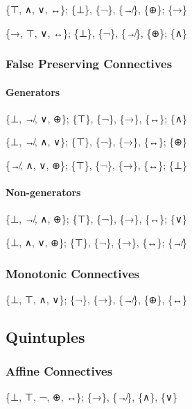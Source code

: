 \{⊤, ∧, ∨, ↔\}; \{⊥\}, \{¬\}, \{↛\}, \{⊕\}; \{→\}

\{→, ⊤, ∨, ↔\}; \{⊥\}, \{¬\}, \{↛\}, \{⊕\}; \{∧\}

\hypertarget{false-preserving-connectives-1}{%
\subsubsection{False Preserving
Connectives}\label{false-preserving-connectives-1}}

\hypertarget{generators-4}{%
\paragraph{Generators}\label{generators-4}}

\{⊥, ↛, ∨, ⊕\}; \{⊤\}, \{¬\}, \{→\}, \{↔\}; \{∧\}

\{⊥, ↛, ∧, ∨\}; \{⊤\}, \{¬\}, \{→\}, \{↔\}; \{⊕\}

\{↛, ∧, ∨, ⊕\}; \{⊤\}, \{¬\}, \{→\}, \{↔\}; \{⊥\}

\hypertarget{non-generators-4}{%
\paragraph{Non-generators}\label{non-generators-4}}

\{⊥, ↛, ∧, ⊕\}; \{⊤\}, \{¬\}, \{→\}, \{↔\}; \{∨\}

\{⊥, ∧, ∨, ⊕\}; \{⊤\}, \{¬\}, \{→\}, \{↔\}; \{↛\}

\hypertarget{monotonic-connectives}{%
\subsubsection{\texorpdfstring{Monotonic Connectives
}{Monotonic Connectives }}\label{monotonic-connectives}}

\{⊥, ⊤, ∧, ∨\}; \{¬\}, \{→\}, \{↛\}, \{⊕\}, \{↔\}

\hypertarget{quintuples}{%
\subsection{Quintuples}\label{quintuples}}

\hypertarget{affine-connectives-2}{%
\subsubsection{Affine Connectives}\label{affine-connectives-2}}

\{⊥, ⊤, ¬, ⊕, ↔\}; \{→\}, \{↛\}, \{∧\}, \{∨\}

